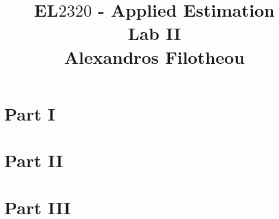 \documentclass[oneside,12pt]{article}
\title{EL$2320$ - Applied Estimation \\ Lab II \\ Alexandros Filotheou}
\date{}
\begin{document}
	\maketitle
	

	\section{Part I}
			
		\newpage
		
		
	\section{Part II}

		\newpage
	
	\section{Part III}

			
\end{document}
